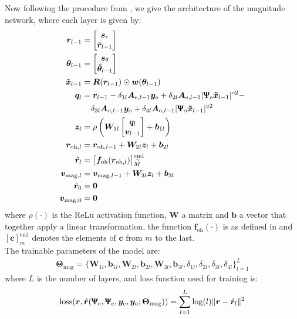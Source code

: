 Now following the procedure from \cite{Neev_2019}, we give the architecture of the magnitude network, where each layer is given by:
\begin{align}
	\bm{r}_{l-1} &= \begin{bmatrix}\bm s_r\\\hat{\bm r}_{l-1}\end{bmatrix}\\
	\bm{\theta}_{l-1} &= \begin{bmatrix}\bm s_\theta\\\hat{\bm \theta}_{l-1}\end{bmatrix}\\
	\bm{\tilde{x}}_{l-1}&=\bm R(\bm{r}_{l-1})\odot\bm w(\bm\theta_{l-1})\\
	\bm q_l& = \bm{r}_{l-1} -\delta_{1l}\bm A_{\text{e},l-1}\bm y_\text{e} +\delta_{2l}\bm A_{\text{e},l-1}|\bm{\bm{\Uppsi}_\text{e}\tilde{x}}_{l-1}|^{\circ2}-\nonumber\\
	&\;\;\;\;\delta_{3l}\bm A_{\text{o},l-1}\bm y_\text{o} +\delta_{4l}\bm A_{\text{o},l-1}|\bm{\bm{\Uppsi}_\text{o}\tilde{x}}_{l-1}|^{\circ2}\\
	\bm z_l&=\rho\left( \bm W_{1l}\begin{bmatrix}\bm q_l\\\bm v_{l-1}\end{bmatrix}+\bm b_{1l}\right)\\
	\bm{r}_{\text{oh},l} &= \bm{r}_{\text{oh},l-1}+\bm W_{2l}\bm z_l+\bm b_{2l}\\
	\hat{\bm{r}}_{l} &= \bigl[\bm f_{\text{oh}}(\bm{r}_{\text{oh},l})\bigr]_{\widetilde{M}}^{\text{end}}\\
	\bm v_{\text{mag},l}&=\bm v_{\text{mag},l-1}+\bm W_{3l}\bm z_l+\bm b_{3l}\\
	\hat{\bm{r}}_{0} &= \bm 0\\
	\bm v_{\text{mag},0}&=\bm 0\\
\end{align}
where $\rho(\cdot)$ is the ReLu activation function, $\bm W$ a matrix and $\bm b$ a vector that together apply a linear transformation,  the function $\bm f_{\text{oh}}(\cdot)$ is as defined in \cite{Neev_2019} and $[\bm c]_m^\text{end}$ denotes the elements of $\bm c$ from $m$ to the last.\\

The trainable parameters of the model are:
\begin{align}
	\bm \Theta_\text{mag} = \bigl\{\bm W_{1l},\bm b_{1l},\bm W_{2l},\bm b_{2l},\bm W_{3l},\bm b_{3l},\delta_{1l},\delta_{2l},\delta_{3l},\delta_{4l}  \bigr\}_{l=1}^L
\end{align}
where $L$ is the number of layers, and loss function used for training is:
\begin{align}
	\text{loss}(\bm r, \hat{\bm r}(\bm{\Uppsi}_\text{e},\bm{\Uppsi}_\text{e},\bm y_\text{e},\bm y_\text{o};\bm \Theta_\text{mag}))=\sum_{l=1}^L\log(l)\lVert \bm r-\hat{\bm{r}}_{l}\rVert^2
\end{align}


